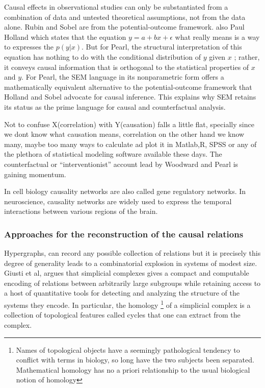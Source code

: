 \documentclass[onecollarge,runningheads]{svjour2}
\begin{document}
Causal effects in observational studies can only be substantiated from a combination of data and untested theoretical assumptions, not from the data alone.
Rubin and Sobel are from the potential-outcome framework. also Paul Holland which states that the equation $y = a +bx+ \epsilon$ what really means is a way to expresses the $p(y|x)$. But for Pearl, the  structural interpretation of this equation has nothing to do with the conditional distribution of ${y}$ given  ${x}$ ; rather, it conveys causal information that is orthogonal to the statistical properties of  ${x}$  and  ${y}$. For Pearl, the SEM language in its nonparametric form offers a mathematically equivalent alternative to the potential-outcome framework that Holland and Sobel advocate for causal inference. This explains why SEM retains its status as the prime language for causal and counterfactual analysis.

\cite{wiedermann2016statistics}
Not to confuse X(correlation) with Y(causation) falls a little flat, specially since we dont know what causation means, correlation on the other hand we know many, maybe too many ways to calculate ad plot it in Matlab,R, SPSS or any of the plethora of statistical modeling software available these days. 
The counterfactual or “interventionist” account lead by Woodward and Pearl is gaining momentum.

In cell biology causality networks are also called gene regulatory networks. In neuroscience, causality networks are widely used to express the temporal interactions between various regions of the brain.
\subsubsection{Approaches for the reconstruction of the causal relations}
Hypergraphs, can record any possible collection of relations but it is precisely this degree of generality leads to a combinatorial explosion in systems of modest size. 
Giusti et al, argues that simplicial complexes gives a compact and computable encoding of relations between arbitrarily large subgroups while retaining access to a host of quantitative tools for detecting and analyzing the structure of the systems they encode. In particular, the homology \footnote{Names of topological objects have a seemingly pathological tendency to conflict with terms in biology, so long have the two subjects been separated. Mathematical homology has no a priori relationship to the usual biological notion of homology} of a simplicial complex is a collection of topological features called cycles that one can extract from the complex.
\end{document}
